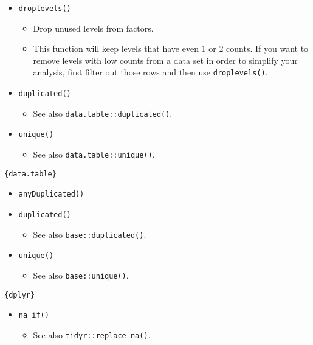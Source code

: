 \documentclass[
]{book}
\providecommand{\tightlist}{%
  \setlength{\itemsep}{0pt}\setlength{\parskip}{0pt}}
\begin{document}
\begin{itemize}
\tightlist
\item
  \texttt{droplevels()}

  \begin{itemize}
  \tightlist
  \item
    Drop unused levels from factors.
  \item
    This function will keep levels that have even 1 or 2 counts. If you want to remove levels with low counts from a data set in order to simplify your analysis, first filter out those rows and then use \texttt{droplevels()}.
  \end{itemize}
\item
  \texttt{duplicated()}

  \begin{itemize}
  \tightlist
  \item
    See also \texttt{data.table::duplicated()}.
  \end{itemize}
\item
  \texttt{unique()}

  \begin{itemize}
  \tightlist
  \item
    See also \texttt{data.table::unique()}.
  \end{itemize}
\end{itemize}

\texttt{\{data.table\}}

\begin{itemize}
\tightlist
\item
  \texttt{anyDuplicated()}
\item
  \texttt{duplicated()}

  \begin{itemize}
  \tightlist
  \item
    See also \texttt{base::duplicated()}.
  \end{itemize}
\item
  \texttt{unique()}

  \begin{itemize}
  \tightlist
  \item
    See also \texttt{base::unique()}.
  \end{itemize}
\end{itemize}

\texttt{\{dplyr\}}

\begin{itemize}
\tightlist
\item
  \texttt{na\_if()}

  \begin{itemize}
  \tightlist
  \item
    See also \texttt{tidyr::replace\_na()}.
  \end{itemize}
\end{itemize}
\end{document}
